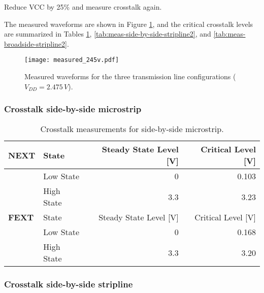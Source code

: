 \documentclass[../main.tex]{subfiles}
\begin{document}
Reduce VCC by 25\% and measure crosstalk again.

\solution

The measured waveforms are shown in Figure \ref{fig:meas-waveforms2}, and the critical crosstalk levels are summarized in Tables \ref{tab:meas-side-by-side-microstrip2}, \ref{tab:meas-side-by-side-stripline2}, and \ref{tab:meas-broadside-stripline2}.

\begin{figure}[h]
    \centering
    \texttt{[image: measured\_245v.pdf]}
    \caption{Measured waveforms for the three transmission line configurations ($V_{DD} = 2.475\,\si{V}$).}
    \label{fig:meas-waveforms2}
\end{figure}

\newpage

\subsubsection{Crosstalk side-by-side microstrip}

\begin{table}[h]
    \centering
    \begin{tabular}{l l|r r}
        \toprule[1pt]
        \textbf{NEXT} & State & Steady State Level [V] & Critical Level [V] \\
        \midrule
        & Low State & 0 & 0.103 \\
        & High State & 3.3 & 3.23 \\
        \midrule[1pt]
        \textbf{FEXT} & State & Steady State Level [V] & Critical Level [V] \\
        \midrule
        & Low State & 0 & 0.168 \\
        & High State & 3.3 & 3.20 \\
        \bottomrule[1pt]
    \end{tabular}
    \caption{Crosstalk measurements for side-by-side microstrip.}
    \label{tab:meas-side-by-side-microstrip2}
\end{table}

\subsubsection{Crosstalk side-by-side stripline}
\end{document}

